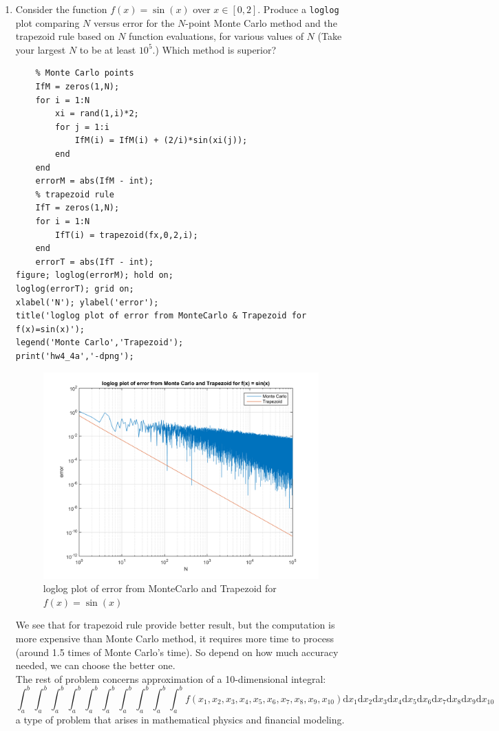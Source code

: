 \documentclass[14pt,a4paper]{article}
\begin{document}
\begin{enumerate}
	\label{4a}
	\item Consider the function $f(x) = \sin(x)$ over $x \in [0,2]$. Produce a \texttt{loglog} plot comparing $N$ versus error for the $N$-point Monte Carlo method and the trapezoid rule based on $N$ function evaluations, for various values of $N$ (Take your largest $N$ to be at least $10^5$.) Which method is superior?
	\begin{lstlisting}
	% Monte Carlo points
	IfM = zeros(1,N);
	for i = 1:N
		xi = rand(1,i)*2;
		for j = 1:i
			IfM(i) = IfM(i) + (2/i)*sin(xi(j));
		end
	end
	errorM = abs(IfM - int);
	% trapezoid rule
	IfT = zeros(1,N);
	for i = 1:N
		IfT(i) = trapezoid(fx,0,2,i);
	end
	errorT = abs(IfT - int);
figure; loglog(errorM); hold on; 
loglog(errorT); grid on;
xlabel('N'); ylabel('error');
title('loglog plot of error from MonteCarlo & Trapezoid for f(x)=sin(x)');
legend('Monte Carlo','Trapezoid');
print('hw4_4a','-dpng');
	\end{lstlisting}
	\begin{figure}[htp]
		\centering
		\includegraphics[scale=0.65]{hw4_4a.png}
		\caption{loglog plot of error from MonteCarlo and Trapezoid for $f(x)=\sin(x)$}
	\end{figure}
	We see that for trapezoid rule provide better result, but the computation is more expensive than Monte Carlo method, it requires more time to process (around 1.5 times of Monte Carlo's time). So depend on how much accuracy needed, we can choose the better one.\\
	
	The rest of problem concerns approximation of a 10-dimensional integral:
	$$ \int_{a}^{b} \int_{a}^{b} \int_{a}^{b} \int_{a}^{b} \int_{a}^{b} \int_{a}^{b} \int_{a}^{b} \int_{a}^{b} \int_{a}^{b} \int_{a}^{b} f(x_1,x_2,x_3,x_4,x_5,x_6,x_7,x_8,x_9,x_{10}) \mathrm{d}x_1\mathrm{d}x_2\mathrm{d}x_3\mathrm{d}x_4\mathrm{d}x_5\mathrm{d}x_6\mathrm{d}x_7\mathrm{d}x_8\mathrm{d}x_9\mathrm{d}x_{10} $$
	a type of problem that arises in mathematical physics and financial modeling.
	

\end{enumerate}
\end{document}
